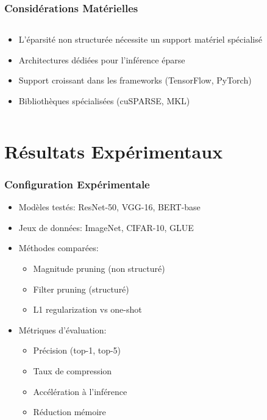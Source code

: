 \documentclass[10pt]{beamer}
\begin{document}
\begin{frame}
\frametitle{Considérations Matérielles}
\begin{columns}
\begin{column}{0.6\textwidth}
\begin{itemize}
    \item L'éparsité non structurée nécessite un support matériel spécialisé
    \item Architectures dédiées pour l'inférence éparse
    \item Support croissant dans les frameworks (TensorFlow, PyTorch)
    \item Bibliothèques spécialisées (cuSPARSE, MKL)
\end{itemize}
\end{column}
\begin{column}{0.4\textwidth}
\centering
\end{column}
\end{columns}
\end{frame}

\section{Résultats Expérimentaux}

\begin{frame}
\frametitle{Configuration Expérimentale}
\begin{itemize}
    \item Modèles testés: ResNet-50, VGG-16, BERT-base
    \item Jeux de données: ImageNet, CIFAR-10, GLUE
    \item Méthodes comparées:
    \begin{itemize}
        \item Magnitude pruning (non structuré)
        \item Filter pruning (structuré)
        \item L1 regularization
         vs one-shot
    \end{itemize}
    \item Métriques d'évaluation:
    \begin{itemize}
        \item Précision (top-1, top-5)
        \item Taux de compression
        \item Accélération à l'inférence
        \item Réduction mémoire
    \end{itemize}
\end{itemize}
\end{frame}
\end{document}

